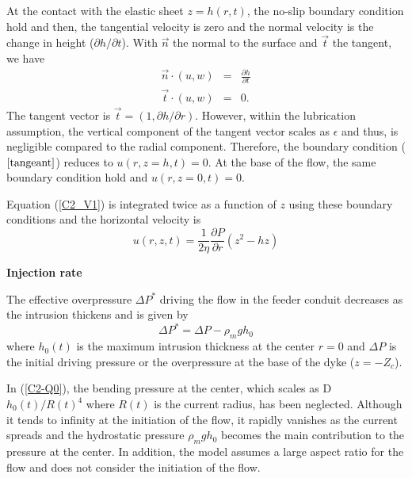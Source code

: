 At the contact with the elastic sheet $z=h(r,t)$, the no-slip boundary
condition  hold and  then, the  tangential  velocity is  zero and  the
normal velocity  is the change  in height ($\partial h/  \partial t$).
With $\vec{n}$ the normal to the surface and $\vec{t}$ the tangent, we
have
\begin{eqnarray}
  \vec{n} \cdot (u,w) &=& \frac{\partial h }{\partial t}\\
  \vec{t} \cdot (u,w) &=& 0 \label{tangeant}.
\end{eqnarray}
The  tangent  vector is  $\vec{t}  =  (1,  \partial h/  \partial  r)$.
However, within the lubrication  assumption, the vertical component of
the  tangent  vector scales  as  $\epsilon$  and thus,  is  negligible
compared to  the radial  component. Therefore, the  boundary condition
($\ref{tangeant}$) reduces  to $u(r,z=h,t)  =0$.  At  the base  of the
flow, the same boundary condition hold and $u(r,z=0,t) =0$.

Equation (\ref{C2_V1}) is integrated twice  as a function of $z$ using
these boundary conditions and the horizontal velocity is
\begin{equation}
  u(r,z,t) =\frac{1}{2\eta} \frac{\partial P}{\partial r} \left(z^2-hz\right)
  \label{C2-vel}
\end{equation}

\vspace{.5cm} \textbf{Injection rate} \vspace{.5cm}

The effective overpressure $\Delta P^*$ driving the flow in the feeder
conduit decreases as the intrusion thickens and is given by
\begin{equation}
  \Delta P^* = \Delta P -\rho_m g h_0 \label{C2-Q0}
\end{equation}
where $h_0(t)$ is the maximum  intrusion thickness at the center $r=0$
and $\Delta P$ is the initial  driving pressure or the overpressure at
the base of the dyke ($z = -Z_c$).

In (\ref{C2-Q0}), the  bending pressure at the center,  which scales as
D$h_0(t)/R(t)^4$  where  $R(t)$  is   the  current  radius,  has  been
neglected.  Although  it tends  to infinity at  the initiation  of the
flow, it rapidly  vanishes as the current spreads  and the hydrostatic
pressure $\rho_m g h_0$ becomes  the main contribution to the pressure
at the  center.  In addition, the  model assumes a large  aspect ratio
for the flow and does not consider the initiation of the flow.

